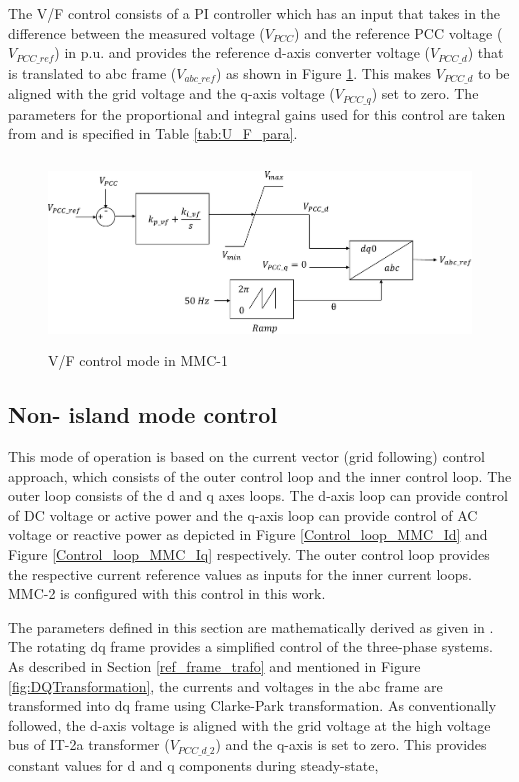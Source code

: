 The V/F control consists of a \gls{PI} controller which has an input that takes in the difference between the measured voltage ($V_{PCC}$) and the reference \gls{PCC} voltage ($V_{PCC\_ref}$) in p.u. and provides the reference d-axis converter voltage ($V_{PCC\_d}$) that is translated to abc frame ($V_{abc\_ref}$) as shown in Figure \ref{fig:U_F_control}. This makes $V_{PCC\_d}$ to be aligned with the grid voltage and the q-axis voltage ($V_{PCC\_q}$) set to zero. The parameters for the proportional and integral gains used for this control are taken from \cite{vrana2013cigre} and is specified in Table \ref{tab:U_F_para}. 

\begin{figure}[H]
\centering
    \includegraphics[height = 5cm,width = 12.5cm]{Diagrams/Chapter_4/U_F_control.pdf}
    \caption{V/F control mode in MMC-1 \cite{vrana2013cigre}}
    \label{fig:U_F_control}
\end{figure}


\subsection{Non- island mode control}
This mode of operation is based on the current vector (grid following) control approach, which consists of the outer control loop and the inner control loop. The outer loop consists of the d and q axes loops. The d-axis loop can provide control of \gls{DC} voltage or active power and the q-axis loop can provide control of \gls{AC} voltage or reactive power as depicted in Figure \ref{Control_loop_MMC_Id} and Figure \ref{Control_loop_MMC_Iq} respectively. The outer control loop provides the respective current reference values as inputs for the inner current loops. \gls{MMC}-2 is configured with this control in this work. 

The parameters defined in this section are mathematically derived as given in \cite{saad2015modelisation}. The rotating dq frame provides a simplified control of the three-phase systems. As described in Section \ref{ref_frame_trafo} and mentioned in Figure \ref{fig:DQTransformation}, the currents and voltages in the abc frame are transformed into dq frame using Clarke-Park transformation.
As conventionally followed, the d-axis voltage is aligned with the grid voltage at the high voltage bus of IT-2a transformer ($V_{PCC\_d\_2}$) and the q-axis is set to zero. This provides constant values for d and q components during steady-state,


